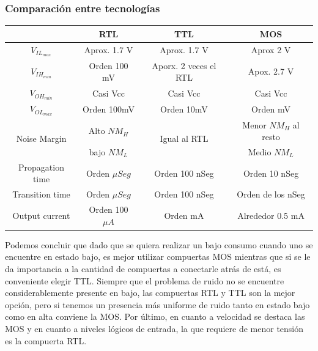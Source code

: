 \subsubsection{Comparación entre tecnologías}
\begin{table}[H]
	\centering
	\begin{tabular}{|c|c|c|c|}
		\hline
		\diagbox{Parámetros}{Tecnologías} & RTL	& TTL & MOS\\
		\hline
		$V_{IL_{max}}$ & Aprox. 1.7 V & Aprox. 1.7 V & Aprox 2 V\\
		\hline
		$V_{IH_{min}}$ & Orden 100 mV & Aporx. 2 veces el RTL & Apox. 2.7 V\\
		\hline
		$V_{OH_{min}}$ & Casi Vcc & Casi Vcc &  Casi Vcc\\
		\hline
		$V_{OL_{max}}$ & Orden 100mV & Orden 10mV  & Orden mV\\
		\hline
		\multirow{2}{*}{Noise Margin} & Alto $NM_{H}$ & \multirow{2}{*}{Igual al RTL} & Menor $NM_{H}$ al resto\\
		 & bajo $NM_{L}$ &  & Medio $NM_{L}$\\
		\hline
		Propagation time & Orden $\mu Seg$ & Orden 100  nSeg & Orden 10 nSeg\\
		\hline
		Transition time & Orden $\mu Seg$ & Orden 100 nSeg & Orden de los nSeg\\
		\hline
		Output current & Orden 100 $\mu A$ & Orden mA & Alrededor 0.5 mA\\
		\hline
	\end{tabular}
\end{table}

Podemos concluir que dado que se quiera realizar un bajo consumo cuando uno se encuentre en estado bajo, es mejor utilizar compuertas MOS mientras que si se le da importancia a la cantidad de compuertas a conectarle atrás de está, es conveniente elegir TTL. Siempre que el problema de ruido no se encuentre considerablemente presente en bajo, las compuertas RTL y TTL son la mejor opción, pero si tenemos un presencia más uniforme de ruido tanto en estado bajo como en alta conviene la MOS. Por último, en cuanto a velocidad se destaca las MOS y en cuanto a niveles lógicos de entrada, la que requiere de menor tensión es la compuerta RTL.